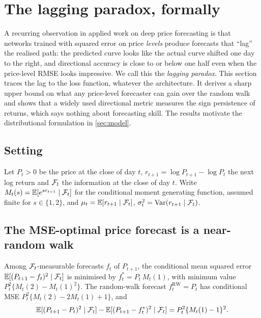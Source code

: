 \section{The lagging paradox, formally}\label{sec:lagging}

A recurring observation in applied work on deep price forecasting is that networks trained with
squared error on price \emph{levels} produce forecasts that ``lag'' the realised path: the
predicted curve looks like the actual curve shifted one day to the right, and directional accuracy
is close to or below one half even when the price-level RMSE looks impressive. We call this the
\emph{lagging paradox}. This section traces the lag to the loss function, whatever the architecture.
It derives a sharp upper bound on what any price-level forecaster can gain over the random walk and
shows that a widely used directional metric measures the sign persistence of returns, which says
nothing about forecasting skill. The results motivate the distributional formulation in
\cref{sec:model}.

\subsection{Setting}
Let $P_t>0$ be the price at the close of day $t$, $r_{t+1}=\log P_{t+1}-\log P_t$ the next log
return and $\mathcal{F}_t$ the information at the close of day $t$. Write
$M_t(s)=\mathbb{E}[e^{s r_{t+1}}\mid\mathcal{F}_t]$ for the conditional moment generating function, assumed finite
for $s\in\{1,2\}$, and $\mu_t=\mathbb{E}[r_{t+1}\mid\mathcal{F}_t]$, $\sigma_t^2=\operatorname{Var}(r_{t+1}\mid\mathcal{F}_t)$.

\subsection{The MSE-optimal price forecast is a near-random walk}

\begin{proposition}\label{prop:optimal-level}
Among $\mathcal{F}_t$-measurable forecasts $f_t$ of $P_{t+1}$, the conditional mean squared error
$\mathbb{E}[(P_{t+1}-f_t)^2\mid\mathcal{F}_t]$ is minimised by $f_t^\ast=P_t\,M_t(1)$, with minimum value
$P_t^2\{M_t(2)-M_t(1)^2\}$. The random-walk forecast $f_t^{\mathrm{RW}}=P_t$ has conditional MSE
$P_t^2\{M_t(2)-2M_t(1)+1\}$, and
\begin{equation}\label{eq:mse-gap}
  \mathbb{E}[(P_{t+1}-P_t)^2\mid\mathcal{F}_t]-\mathbb{E}[(P_{t+1}-f_t^\ast)^2\mid\mathcal{F}_t]=P_t^2\{M_t(1)-1\}^2 .
\end{equation}
\end{proposition}

